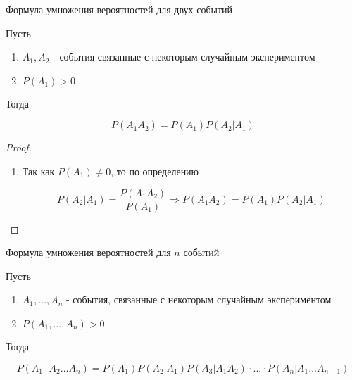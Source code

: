 \documentclass[a4paper, 14pt]{report}
\begin{document}
\begin{theorem}
    Формула умножения вероятностей для двух событий

    Пусть 

    \begin{enumerate}
        \item $A_1, A_2$ - события связанные с некоторым случайным экспериментом
        \item $P(A_1) > 0$
    \end{enumerate}

    Тогда

    $$
    P(A_1A_2) = P(A_1)P(A_2|A_1)
    $$
\end{theorem}

\begin{proof}
    \begin{enumerate}
        \item Так как $P(A_1) \ne 0$, то по определению

            $$
            P(A_2|A_1) = \frac{P(A_1A_2)}{P(A_1)} \Rightarrow P(A_1A_2) = P(A_1)P(A_2|A_1)
            $$
    \end{enumerate}    
\end{proof}

\begin{theorem}
    Формула умножения вероятностей для $n$ событий

    Пусть

    \begin{enumerate}
        \item $A_1,...,A_n$ - события, связанные с некоторым случайным экспериментом
        \item $P(A_1,...,A_n) > 0$
    \end{enumerate}

    Тогда

    $$
    P(A_1 \cdot A_2 ... A_n) = P(A_1)P(A_2|A_1)P(A_3|A_1A_2) \cdot ... \cdot P(A_n|A_1...A_{n-1})
    $$
\end{theorem}
\end{document}
